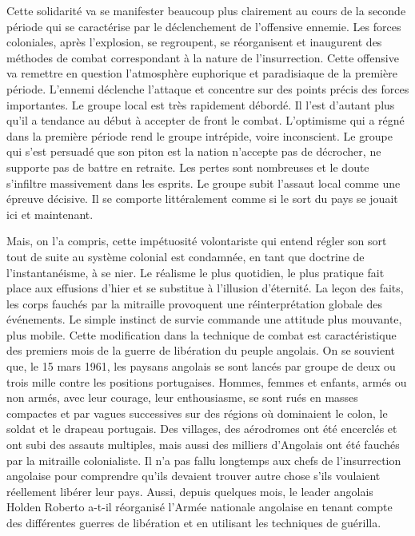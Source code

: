 \documentclass[french,twoside]{book} %
\begin{document}
\bigbreak
\noindent Cette solidarité va se manifester beaucoup plus clairement au cours de la seconde période qui se caractérise par le déclenchement de l’offensive ennemie. Les forces coloniales, après l’explosion, se regroupent, se réorganisent et inaugurent des méthodes de combat correspondant à la nature de l’insurrection. Cette offensive va remettre en question l’atmosphère euphorique et paradisiaque de la première période. L’ennemi déclenche l’attaque et concentre sur des points précis des forces importantes. Le groupe local est très rapidement débordé. Il l’est d’autant plus qu’il a tendance au début à accepter de front le combat. L’optimisme qui a régné dans la première période rend le groupe intrépide, voire inconscient. Le groupe qui s’est persuadé que son piton est la nation n’accepte pas de décrocher, ne supporte pas de battre en retraite. Les pertes sont nombreuses et le doute s’infiltre massivement dans les esprits. Le groupe subit l’assaut local comme une épreuve décisive. Il se comporte littéralement comme si le sort du pays se jouait ici et maintenant.\par
Mais, on l’a compris, cette impétuosité volontariste qui entend régler son sort tout de suite au système colonial est condamnée, en tant que doctrine de l’instantanéisme, à se nier. Le réalisme le plus quotidien, le plus pratique fait place aux effusions d’hier et se substitue à l’illusion d’éternité. La leçon des faits, les corps fauchés par la mitraille provoquent une réinterprétation globale des événements. Le simple instinct de survie commande une attitude plus mouvante, plus mobile. Cette modification dans la technique de combat est caractéristique des premiers mois de la guerre de libération du peuple angolais. On se souvient que, le 15 mars 1961, les paysans angolais se sont   lancés par groupe de deux ou trois mille contre les positions portugaises. Hommes, femmes et enfants, armés ou non armés, avec leur courage, leur enthousiasme, se sont rués en masses compactes et par vagues successives sur des régions où dominaient le colon, le soldat et le drapeau portugais. Des villages, des aérodromes ont été encerclés et ont subi des assauts multiples, mais aussi des milliers d’Angolais ont été fauchés par la mitraille colonialiste. Il n’a pas fallu longtemps aux chefs de l’insurrection angolaise pour comprendre qu’ils devaient trouver autre chose s’ils voulaient réellement libérer leur pays. Aussi, depuis quelques mois, le leader angolais Holden Roberto a-t-il réorganisé l’Armée nationale angolaise en tenant compte des différentes guerres de libération et en utilisant les techniques de guérilla.\par
\end{document}
